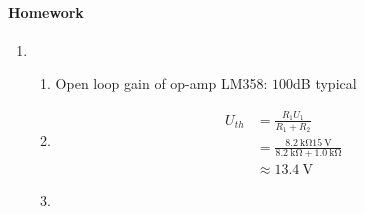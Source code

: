 \paragraph{Homework}

\begin{enumerate}
	\item
	\begin{enumerate}
		\item 
		Open loop gain of op-amp LM358: $100$dB typical
		
		\item
		\begin{align*}
			U_{th}
			&=\frac{R_1 U_1}{R_1 + R_2} \\
			&= \frac{\SI{8.2}{\kilo \ohm} \SI{15}{\volt}}{\SI{8.2}{\kilo \ohm} + \SI{1.0}{\kilo \ohm}} \\
			&\approx \SI{13.4}{\volt}
		\end{align*}
		
		\item
		
	\end{enumerate}
\end{enumerate}